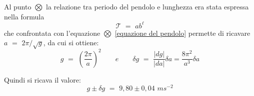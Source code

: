 Al punto $\bigotimes$ la relazione tra periodo del pendolo e lunghezza era stata espressa nella formula
\begin{equation*}
\mathcal{T} \,\, = \,\, ab^{\ell}
\end{equation*}
che confrontata con l'equazione $\bigotimes$ \ref{equazione del pendolo} permette di ricavare $a \,\, = \,\, 2 \pi / \sqrt{g}$, da cui si ottiene:
\begin{equation}
g \,\, = \,\, \left( \frac{2 \pi}{a}\right)^2 \quad\quad e \quad\quad \delta g \,\, = \,\, \frac{\vert dg \vert}{\vert da\vert} \delta a = \frac{8 \pi^2}{a^3} \delta a
\end{equation}

Quindi si ricava il valore:
\begin{equation}
g \pm \delta g \,\, = \,\, 9,80 \pm 0,04 \,\, ms^{-2}
\end{equation}
